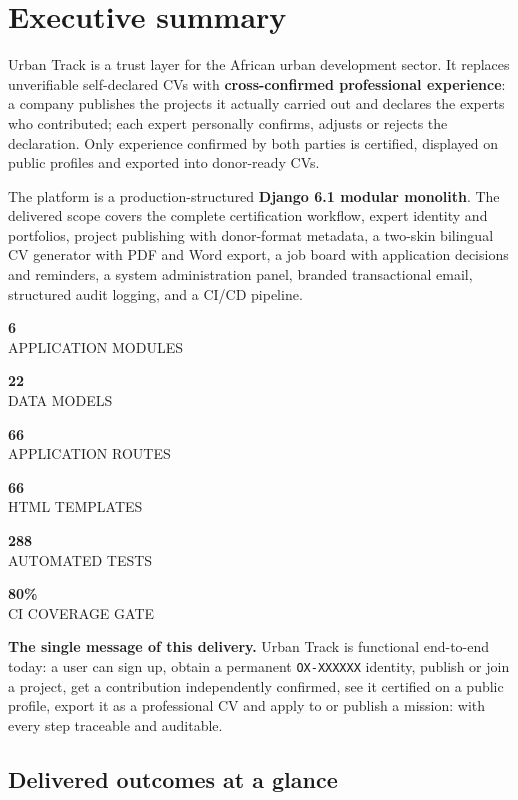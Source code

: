 \documentclass[11pt,a4paper]{article}
\newcommand{\statbox}[2]{%
  \begin{minipage}[t]{0.155\textwidth}
    \centering
    {\fontsize{23}{25}\selectfont\bfseries\color{mil700}#1}\\[3pt]
    {\scriptsize\color{char300}\MakeUppercase{#2}}
  \end{minipage}%
}
\begin{document}
\clearpage
{}
\tableofcontents
\clearpage
{}

\section{Executive summary}

Urban Track is a trust layer for the African urban development sector. It
replaces unverifiable self-declared CVs with \textbf{cross-confirmed
professional experience}: a company publishes the projects it actually carried
out and declares the experts who contributed; each expert personally confirms,
adjusts or rejects the declaration. Only experience confirmed by both parties
is certified, displayed on public profiles and exported into donor-ready CVs.

The platform is a production-structured \textbf{Django 6.1 modular monolith}.
The delivered scope covers the complete certification workflow, expert
identity and portfolios, project publishing with donor-format metadata, a
two-skin bilingual CV generator with PDF and Word export, a job board with
application decisions and reminders, a system administration panel, branded
transactional email, structured audit logging, and a CI/CD pipeline.

\begin{center}
  \statbox{6}{application modules}
  \hfill
  \statbox{22}{data models}
  \hfill
  \statbox{66}{application routes}
  \hfill
  \statbox{66}{HTML templates}
  \hfill
  \statbox{288}{automated tests}
  \hfill
  \statbox{80\%}{CI coverage gate}
\end{center}

\begin{keybox}
\textbf{The single message of this delivery.} Urban Track is functional
end-to-end today: a user can sign up, obtain a permanent \texttt{OX-XXXXXX}
identity, publish or join a project, get a contribution independently
confirmed, see it certified on a public profile, export it as a professional CV
and apply to or publish a mission: with every step traceable and auditable.
\end{keybox}

\subsection*{Delivered outcomes at a glance}
\end{document}
